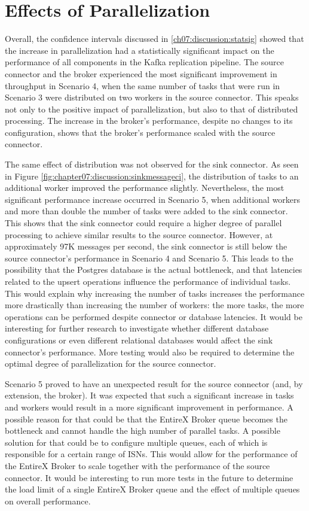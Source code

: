 \section{Effects of Parallelization}
Overall, the confidence intervals discussed in \ref{ch07:discussion:statsig} showed that the increase in parallelization had a statistically significant impact on the performance of all components in the Kafka replication pipeline. The source connector and the broker experienced the most significant improvement in throughput in Scenario 4, when the same number of tasks that were run in Scenario 3 were distributed on two workers in the source connector. This speaks not only to the positive impact of parallelization, but also to that of distributed processing. The increase in the broker's performance, despite no changes to its configuration, shows that the broker's performance scaled with the source connector. %

The same effect of distribution was not observed for the sink connector. As seen in Figure \ref{fig:chapter07:discussion:sinkmessageci}, the distribution of tasks to an additional worker improved the performance slightly. Nevertheless, the most significant performance increase occurred in Scenario 5, when additional workers and more than double the number of tasks were added to the sink connector. This shows that the sink connector could require a higher degree of parallel processing to achieve similar results to the source connector. However, at approximately 97K messages per second, the sink connector is still below the source connector's performance in Scenario 4 and Scenario 5. This leads to the possibility that the Postgres database is the actual bottleneck, and that latencies related to the upsert operations influence the performance of individual tasks. This would explain why increasing the number of tasks increases the performance more drastically than increasing the number of workers: the more tasks, the more operations can be performed despite connector or database latencies. It would be interesting for further research to investigate whether different database configurations or even different relational databases would affect the sink connector's performance. More testing would also be required to determine the optimal degree of parallelization for the source connector.

Scenario 5 proved to have an unexpected result for the source connector (and, by extension, the broker). It was expected that such a significant increase in tasks and workers would result in a more significant improvement in performance. A possible reason for that could be that the EntireX Broker queue becomes the bottleneck and cannot handle the high number of parallel tasks. A possible solution for that could be to configure multiple queues, each of which is responsible for a certain range of \ac{ISN}s. This would allow for the performance of the EntireX Broker to scale together with the performance of the source connector. It would be interesting to run more tests in the future to determine the load limit of a single EntireX Broker queue and the effect of multiple queues on overall performance.

